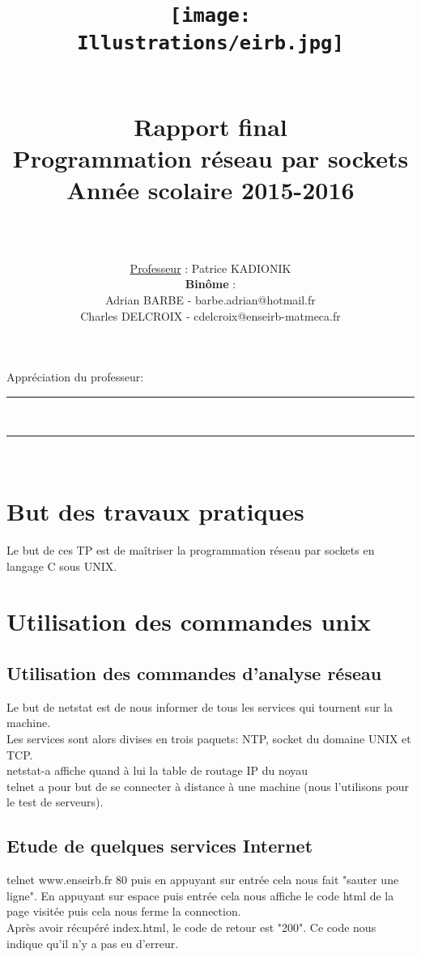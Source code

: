 \documentclass[paper=a4, fontsize=12pt]{article}
\title{
\begin{figure}[H]
\centering
\texttt{[image: Illustrations/eirb.jpg]}
\end{figure}
  \usefont{OT1}{bch}{b}{n}
  \horrule{1.5pt} \\[0.5cm]	
  \Huge \textbf{Rapport final} \\ [10pt]
  \Huge Programmation réseau par sockets \\ [15pt]
  \LARGE Année scolaire 2015-2016 \\ 
  \horrule{1.5pt} \\[0.5cm]
}
\author{
  \huge \underline{Professeur} : \LARGE Patrice KADIONIK\\[20pt]
  \normalfont 							
  \huge \textbf{Binôme} :\\[10pt]
\Large Adrian BARBE - barbe.adrian@hotmail.fr\\[5pt]
 \Large Charles DELCROIX - cdelcroix@enseirb-matmeca.fr \\[5pt]
  \normalsize
}
\date{}
\numberwithin{equation}{section}		%
\numberwithin{figure}{section}			%
\numberwithin{table}{section}				%
\newcommand{\horrule}[1]{\rule{\linewidth}{#1}} 	%
\begin{document}
\maketitle
\newpage
 \Large Appréciation du professeur:\\
 \vspace{10\baselineskip}
  \horrule{1.5pt} \\[0.5cm]
\horrule{1.5pt} \\[0.5cm]
\normalsize
\tableofcontents

\newpage
\section{But des travaux pratiques}
Le but de ces TP est de maîtriser la programmation réseau par sockets en langage C sous UNIX.
\section{Utilisation des commandes unix}
\subsection{Utilisation des commandes d'analyse réseau}
Le but de netstat est de nous informer de tous les services qui tournent sur la machine.\\
Les services sont alors divises en trois paquets: NTP, socket du domaine UNIX et TCP.\\
netstat-a affiche quand à lui la table de routage IP du noyau
\\telnet a pour but de se connecter à distance à une machine (nous l'utilisons pour le test de serveurs).
\subsection{Etude de quelques services Internet}
telnet www.enseirb.fr 80 puis en appuyant sur entrée cela nous fait "sauter une ligne". En appuyant sur espace puis entrée cela nous affiche le code html de la page visitée puis cela nous ferme la connection.
\\Après avoir récupéré index.html, le code de retour est "200". Ce code nous indique qu'il n'y a pas eu d'erreur.
\end{document}
